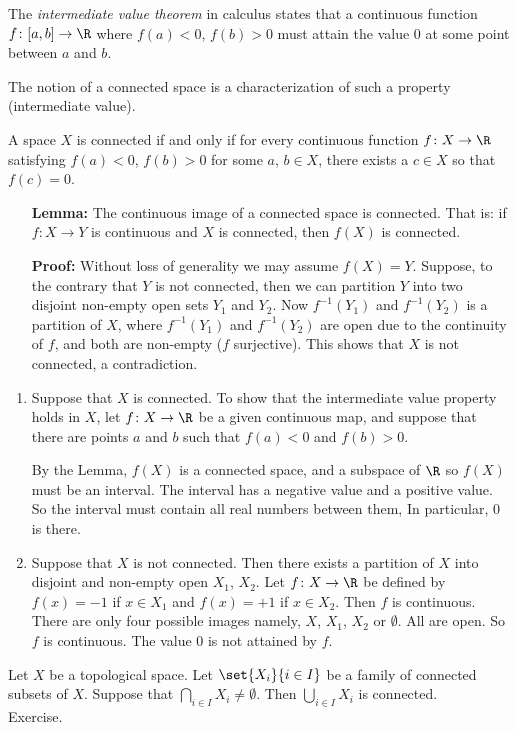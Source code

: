 The \emph{intermediate value theorem} in calculus states that a continuous function $f\colon[a,b]\to\R$ where $f(a)<0$, $f(b)>0$ must attain the value $0$ at some point between $a$ and $b$.

The notion of a connected space is a characterization of such a property (intermediate value).

\thm
A space $X$ is connected if and only if for every continuous function $f\colon X\to\R$ satisfying $f(a)<0$, $f(b)>0$ for some $a$, $b\in X$, there exists a $c\in X$ so that $f(c)=0$. \\
\pf
\begin{itemize}
\item[\textbf{Lemma:}] The continuous image of a connected space is connected.  That is: if $f\colon X\to Y$ is continuous and $X$ is connected, then $f(X)$ is connected.
\item[\textbf{Proof:}] Without loss of generality we may assume $f(X)=Y$.  Suppose, to the contrary that $Y$ is not connected, then we can partition $Y$ into two disjoint non-empty open sets $Y_1$ and $Y_2$.  Now $f^{-1}(Y_1)$ and $f^{-1}(Y_2)$ is a partition of $X$, where $f^{-1}(Y_1)$ and $f^{-1}(Y_2)$ are open due to the continuity of $f$, and both are non-empty ($f$ surjective).  This shows that $X$ is not connected, a contradiction.
\end{itemize}
\begin{enumerate}[label=(\roman*)]
\item Suppose that $X$ is connected.  To show that the intermediate value property holds in $X$, let $f\colon X\to\R$ be a given continuous map, and suppose that there are points $a$ and $b$ such that $f(a)<0$ and $f(b)>0$.

By the Lemma, $f(X)$ is a connected space, and a subspace of $\R$ so $f(X)$ must be an interval.  The interval has a negative value and a positive value.  So the interval must contain all real numbers between them,  In particular, $0$ is there.
\item Suppose that $X$ is not connected.  Then there exists a partition of $X$ into disjoint and non-empty open $X_1$, $X_2$.  Let $f\colon X\to\R$ be defined by $f(x)=-1$ if $x\in X_1$ and $f(x)=+1$ if $x\in X_2$.  Then $f$ is continuous.  There are only four possible images namely, $X$, $X_1$, $X_2$ or $\emptyset$.  All are open.  So $f$ is continuous.  The value $0$ is not attained by $f$.
\end{enumerate}
\prop Let $X$ be a topological space.  Let $\set{X_i}{i\in I}$ be a family of connected subsets of $X$.  Suppose that $\bigcap_{i\in I}X_i\neq\emptyset$.  Then $\bigcup_{i\in I}X_i$ is connected. \\
\pf Exercise. \begin{small}\end{small}
